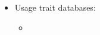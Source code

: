 \begin{itemize}
    \item Usage trait databases: 
    \begin{itemize}
    \item 
        
    \end{itemize}
\end{itemize}
